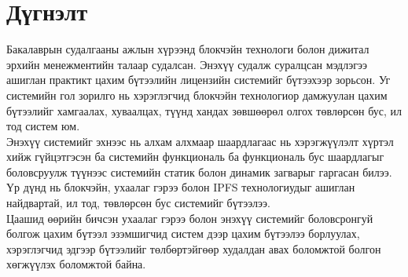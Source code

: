 \chapter{Дүгнэлт}
\indent Бакалаврын судалгааны ажлын хүрээнд блокчэйн технологи болон дижитал эрхийн менежментийн талаар судалсан. Энэхүү судалж суралцсан мэдлэгээ ашиглан практикт цахим бүтээлийн лицензийн системийг бүтээхээр зорьсон. Уг системийн гол зорилго нь хэрэглэгчид блокчэйн технологиор дамжуулан цахим бүтээлийг хамгаалах, хуваалцах, түүнд хандах зөвшөөрөл олгох төвлөрсөн бус, ил тод систем юм.
\\ \indent Энэхүү системийг эхнээс нь алхам алхмаар шаардлагаас нь хэрэгжүүлэлт хүртэл хийж гүйцэтгэсэн ба системийн функциональ ба функциональ бус шаардлагыг боловсруулж түүнээс системийн статик болон динамик загварыг гаргасан билээ. Үр дүнд нь блокчэйн, ухаалаг гэрээ болон IPFS технологиудыг ашиглан найдвартай, ил тод, төвлөрсөн бус системийг бүтээлээ.
\\ \indent Цаашид өөрийн бичсэн ухаалаг гэрээ болон энэхүү системийг боловсронгуй болгож цахим бүтээл эзэмшигчид систем дээр цахим бүтээлээ борлуулах, хэрэглэгчид эдгээр бүтээлийг төлбөртэйгөөр худалдан авах боломжтой болгон хөгжүүлэх боломжтой байна.